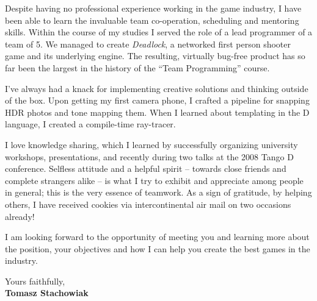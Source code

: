 \documentclass[11pt]{article}
\begin{document}
Despite having no professional experience working in the game industry, I have been able to learn the invaluable team co-operation, scheduling and mentoring skills. Within the course of my studies I served the role of a lead programmer of a team of 5. We managed to create \emph{Deadlock}, a networked first person shooter game and its underlying engine. The resulting, virtually bug-free product has so far been the largest in the history of the ``Team Programming'' course.

I've always had a knack for implementing creative solutions and thinking outside of the box. Upon getting my first camera phone, I crafted a pipeline for snapping HDR photos and tone mapping them. When I learned about templating in the D language, I created a compile-time ray-tracer.

I love knowledge sharing, which I learned by successfully organizing university workshops, presentations, and recently during two talks at the 2008 Tango D conference. Selfless attitude and a helpful spirit -- towards close friends and complete strangers alike -- is what I try to exhibit and appreciate among people in general; this is the very essence of teamwork. As a sign of gratitude, by helping others, I have received cookies via intercontinental air mail on two occasions already!

I am looking forward to the opportunity of meeting you and learning more about the position, your objectives and how I can help you create the best games in the industry.


Yours faithfully,\\[2em] %
%
{\bfseries Tomasz Stachowiak}
%
\end{document}
